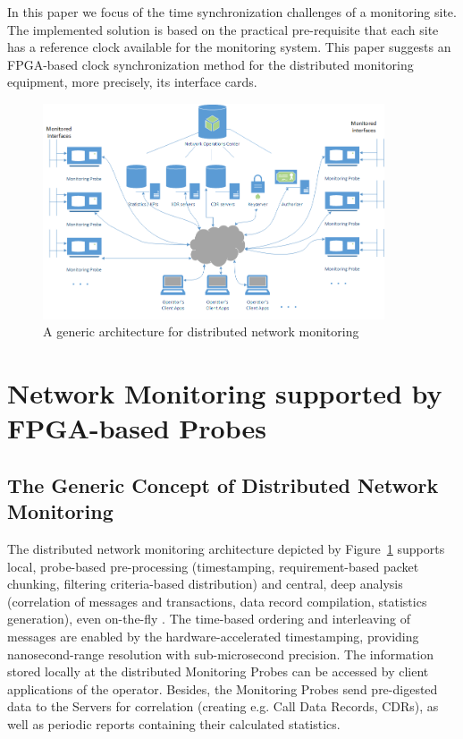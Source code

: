 \documentclass[journal]{IEEEtran}
\begin{document}
In this paper we focus of the time synchronization challenges of a monitoring site. The implemented solution is based on the practical pre-requisite that each site has a reference clock available for the monitoring system. This paper suggests an FPGA-based clock synchronization method for the distributed monitoring equipment, more precisely, its interface cards.

\begin{figure}[!htb]
    \centering
    \includegraphics[width=0.9\textwidth]{figures_raw/Network_monitoring.png}
    \caption{A generic architecture for distributed network monitoring}
    \label{fig:network_monitoring}
\end{figure}

\section{Network Monitoring supported by FPGA-based Probes}\label{sec:NetMon}
\subsection{The Generic Concept of Distributed Network Monitoring}

The distributed network monitoring architecture depicted by Figure~\ref{fig:network_monitoring} supports local, probe-based pre-processing (timestamping, requirement-based packet chunking, filtering criteria-based distribution) and central, deep analysis (correlation of messages and transactions, data record compilation, statistics generation), even on-the-fly \cite{old_5}. The time-based ordering and interleaving of messages are enabled by the hardware-accelerated timestamping, providing nanosecond-range resolution with sub-microsecond precision. The information stored locally at the distributed Monitoring Probes can be accessed by client applications of the operator. Besides, the Monitoring Probes send pre-digested data to the Servers for correlation (creating e.g. Call Data Records, CDRs), as well as periodic reports containing their calculated statistics.
\end{document}
